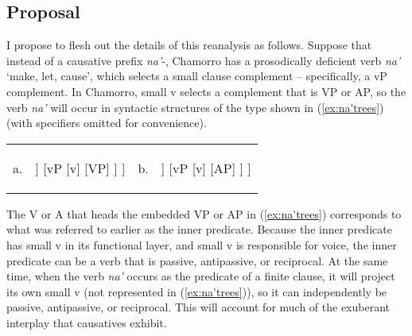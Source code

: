 \documentclass[output=paper,
modfonts
]{LSP/langsci}
\begin{document}
\begin{exe}
\begin{xlist}
\subsection{Proposal}

I propose to flesh out the details of this reanalysis as follows.
Suppose that instead of a causative prefix \emph{na'}-, Chamorro has a
prosodically deficient verb \emph{na'} `make, let, cause', which selects
a small clause complement -- specifically, a vP complement. In Chamorro,
small v selects a complement that is VP or AP, so the verb \emph{na'}
will occur in syntactic structures of the type shown in (\ref{ex:na'trees}) (with
specifiers omitted for convenience).

\ea
\begin{tabularx}{\linewidth-0.1em}[t]{lXlX}
	a. &
	\begin{forest}
		[VP
			[V
				[na']
			]
			[vP
				[v]
				[VP]
			]
		]
	\end{forest} &
b. &
\begin{forest}
		[VP
			[V
				[na']
			]
			[vP
				[v]
				[AP]
			]
		]
	\end{forest} \\	
\end{tabularx}\label{ex:na'trees}
\z

The V or A that heads the embedded VP or AP in (\ref{ex:na'trees}) corresponds to what
was referred to earlier as the inner predicate. Because the inner
predicate has small v in its functional layer, and small v is
responsible for voice, the inner predicate can be a verb that is
passive, antipassive, or reciprocal. At the same time, when the verb
\emph{na'} occurs as the predicate of a finite clause, it will project
its own small v (not represented in (\ref{ex:na'trees})), so it can independently be
passive, antipassive, or reciprocal. This will account for much of the
exuberant interplay that causatives exhibit.


\end{xlist}
\end{exe}
\end{document}
